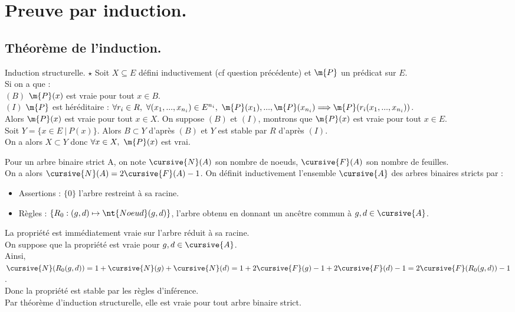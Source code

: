 \documentclass[french, 11pt]{article}
\begin{document}
\section{Preuve par induction.}
\subsection{Théorème de l'induction.}

\begin{thm}{Induction structurelle. $\star$}{}
    Soit $X\subseteq E$ défini inductivement (cf question précédente) et $\m{P}$ un prédicat sur $E$.\\
    Si on a que :\\
    \hspace*{2em}$(B)$ $\m{P}(x)$ est vraie pour tout $x\in B$.\\
    \hspace*{2em}$(I)$ $\m{P}$ est héréditaire : $\forall r_i\in R, ~ \forall (x_1,...,x_{n_i})\in E^{n_i}, ~ \m{P}(x_1),...,\m{P}(x_{n_i})\Longrightarrow \m{P}(r_i(x_1, ..., x_{n_i}))$.\\
    Alors $\m{P}(x)$ est vraie pour tout $x\in X$.
    \tcblower
    On suppose $(B)$ et $(I)$, montrons que $\m{P}(x)$ est vraie pour tout $x\in E$.\\
    Soit $Y = \{x\in E ~ | ~ P(x)\}$. Alors $B \subset Y$ d'après $(B)$ et $Y$ est stable par $R$ d'après $(I)$.\\
    On a alors $X \subset Y$ donc $\forall x \in X, ~ \m{P}(x)$ est vrai.
\end{thm}

\begin{ex}{}{}
    Pour un arbre binaire strict A, on note $\cursive{N}(A)$ son nombre de noeuds, $\cursive{F}(A)$ son nombre de feuilles.\\
    On a alors $\cursive{N}(A)=2\cursive{F}(A)-1$.
    \tcblower
    On définit inductivement l'ensemble $\cursive{A}$ des arbres binaires stricts par :
    \begin{itemize}[topsep=0pt,itemsep=-0.9 ex]
        \item Assertions : $\{0\}$ l'arbre restreint à sa racine.
        \item Règles : $\{R_0:(g,d) \mapsto \nt{Noeud}(g,d)\}$, l'arbre obtenu en donnant un ancêtre commun à $g,d\in\cursive{A}$.
    \end{itemize}
    La propriété est immédiatement vraie sur l'arbre réduit à sa racine.\\
    On suppose que la propriété est vraie pour $g,d\in\cursive{A}$.\\
    Ainsi, $\cursive{N}(R_0(g,d))=1+\cursive{N}(g)+\cursive{N}(d)=1+2\cursive{F}(g)-1+2\cursive{F}(d)-1=2\cursive{F}(R_0(g,d))-1$.\\
    Donc la propriété est stable par les règles d'inférence.\\
    Par théorème d'induction structurelle, elle est vraie pour tout arbre binaire strict.
\end{ex}
\end{document}

